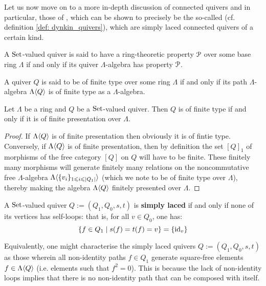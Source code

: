             Let us now move on to a more in-depth discussion of connected quivers and in particular, those of , which can be shown to precisely be the so-called  (cf. definition \ref{def: dynkin_quivers}), which are simply laced connected quivers of a certain kind. 
            \begin{definition}
                A $\mathrm{Set}$-valued quiver is said to have a ring-theoretic property $\mathcal{P}$ over some base ring $\Lambda$ if and only if its quiver $\Lambda$-algebra has property $\mathcal{P}$. 
            \end{definition}
            \begin{example}
                A quiver $Q$ is said to be of finite type over some ring $\Lambda$ if and only if its path $\Lambda$-algebra $\Lambda\langle Q\rangle$ is of finite type as a $\Lambda$-algebra.
            \end{example}
            \begin{proposition} \label{prop: quivers_of_finite_type_are_of_finite_presentations}
                Let $\Lambda$ be a ring and $Q$ be a $\mathrm{Set}$-valued quiver. Then $Q$ is of finite type if and only if it is of finite presentation over $\Lambda$.
            \end{proposition}
                \begin{proof}
                    If $\Lambda\langle Q\rangle$ is of finite presentation then obviously it is of fintie type. Conversely, if $\Lambda\langle Q\rangle$ is of finite presentation, then by definition the set $[Q]_1$ of morphisms of the free category $[Q]$ on $Q$ will have to be finite. These finitely many morphisms will generate finitely many relations on the noncommutative free $\Lambda$-algebra $\Lambda\langle\{v_i\}_{1 \leqslant i \leqslant |Q_1|}\rangle$ (which we note to be of finite type over $\Lambda$), thereby making the algebra $\Lambda\langle Q\rangle$ finitely presented over $\Lambda$.
                \end{proof}
            \begin{definition} \label{def: simply_laced_quivers}
                A $\mathrm{Set}$-valued quiver $Q := (Q_1, Q_0, s, t)$ is \textbf{simply laced} if and only if none of its vertices has self-loops: that is, for all $v \in Q_0$, one has:
                    $$\{f \in Q_1 \mid s(f) = t(f) = v\} = \{\mathrm{id}_v\}$$
            \end{definition}
            \begin{remark}
                Equivalently, one might characterise the simply laced quivers $Q := (Q_1, Q_0, s, t)$ as those wherein all non-identity paths $f \in Q_1$ generate square-free elements $f \in \Lambda\langle Q\rangle$ (i.e. elements such that $f^2 = 0$). This is because the lack of non-identity loops implies that there is no non-identity path that can be composed with itself. 
            \end{remark}
